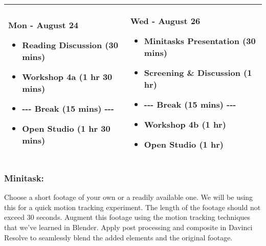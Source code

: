 \documentclass[10pt,letter,english]{article}
\begin{document}
\begin{longtable}[]{@{}ll@{}}
      \toprule
      \endhead
      \begin{minipage}[t]{0.47\columnwidth}\raggedright
            \textbf{{Mon - August 24}}

            \begin{itemize}
                  \item
                        Reading Discussion (30 mins)
                  \item
                        Workshop 4a (1 hr 30 mins)
                  \item
                        -\/-\/- Break (15 mins) -\/-\/-
                  \item
                        Open Studio (1 hr 30 mins)
            \end{itemize}\strut
      \end{minipage} & \begin{minipage}[t]{0.47\columnwidth}\raggedright
            \textbf{{Wed - August 26}}

            \begin{itemize}
                  \item
                        Minitasks Presentation (30 mins)
                  \item
                        Screening \& Discussion (1 hr)
                  \item
                        -\/-\/- Break (15 mins) -\/-\/-
                  \item
                        Workshop 4b (1 hr)
                  \item
                        Open Studio (1 hr)
            \end{itemize}\strut
      \end{minipage}\tabularnewline
      \bottomrule
\end{longtable}

\hypertarget{minitask-3}{%
      \subsubsection*{\texorpdfstring{Minitask:
            }{Minitask: }}\label{minitask-3}}

Choose a short footage of your own or a readily available one. We will be using this for a quick motion tracking experiment. The length of the footage should not exceed 30 seconds. Augment this footage using the motion tracking techniques that we've learned in Blender. Apply post processing and composite in Davinci Resolve to seamlessly blend the added elements and the original footage.
\end{document}
